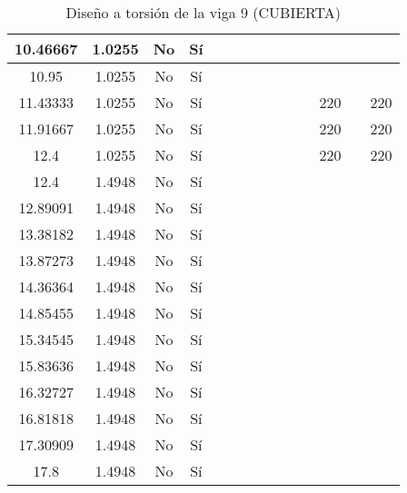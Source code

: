 \begin{table}[H]
{\begin{tabular}{|c|c|c|c|c|c|c|c|c|c|c|c|c|c|}
10.46667 & 1.0255 & No  & Sí  &     &     &     &     &     &     &     &     &     &  \bigstrut\\
\hline
10.95 & 1.0255 & No  & Sí  &     &     &     &     &     &     &     &     &     &  \bigstrut\\
\hline
11.43333 & 1.0255 & No  & Sí  &     &     &     &     &     &     &     & 220 &     & 220 \bigstrut\\
\hline
11.91667 & 1.0255 & No  & Sí  &     &     &     &     &     &     &     & 220 &     & 220 \bigstrut\\
\hline
12.4 & 1.0255 & No  & Sí  &     &     &     &     &     &     &     & 220 &     & 220 \bigstrut\\
\hline
12.4 & 1.4948 & No  & Sí  &     &     &     &     &     &     &     &     &     &  \bigstrut\\
\hline
12.89091 & 1.4948 & No  & Sí  &     &     &     &     &     &     &     &     &     &  \bigstrut\\
\hline
13.38182 & 1.4948 & No  & Sí  &     &     &     &     &     &     &     &     &     &  \bigstrut\\
\hline
13.87273 & 1.4948 & No  & Sí  &     &     &     &     &     &     &     &     &     &  \bigstrut\\
\hline
14.36364 & 1.4948 & No  & Sí  &     &     &     &     &     &     &     &     &     &  \bigstrut\\
\hline
14.85455 & 1.4948 & No  & Sí  &     &     &     &     &     &     &     &     &     &  \bigstrut\\
\hline
15.34545 & 1.4948 & No  & Sí  &     &     &     &     &     &     &     &     &     &  \bigstrut\\
\hline
15.83636 & 1.4948 & No  & Sí  &     &     &     &     &     &     &     &     &     &  \bigstrut\\
\hline
16.32727 & 1.4948 & No  & Sí  &     &     &     &     &     &     &     &     &     &  \bigstrut\\
\hline
16.81818 & 1.4948 & No  & Sí  &     &     &     &     &     &     &     &     &     &  \bigstrut\\
\hline
17.30909 & 1.4948 & No  & Sí  &     &     &     &     &     &     &     &     &     &  \bigstrut\\
\hline
17.8 & 1.4948 & No  & Sí  &     &     &     &     &     &     &     &     &     &  \bigstrut\\
\hline
\end{tabular}%

  



  }
      \caption{Diseño a torsión de la viga 9 (CUBIERTA) }
  \label{tab:T VG9 CUB }%
\end{table}%